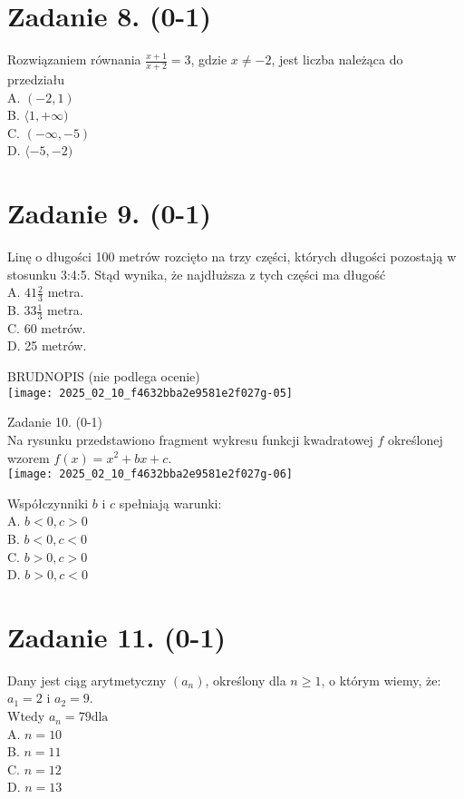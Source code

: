 \documentclass[10pt]{article}
\begin{document}
\section*{Zadanie 8. (0-1)}
Rozwiązaniem równania \(\frac{x+1}{x+2}=3\), gdzie \(x \neq-2\), jest liczba należąca do przedziału\\
A. \((-2,1)\)\\
B. \(\langle 1,+\infty)\)\\
C. \((-\infty,-5)\)\\
D. \(\langle-5,-2)\)

\section*{Zadanie 9. (0-1)}
Linę o długości 100 metrów rozcięto na trzy części, których długości pozostają w stosunku 3:4:5. Stąd wynika, że najdłuższa z tych części ma długość\\
A. \(41 \frac{2}{3}\) metra.\\
B. \(33 \frac{1}{3}\) metra.\\
C. 60 metrów.\\
D. 25 metrów.

BRUDNOPIS (nie podlega ocenie)\\
\texttt{[image: 2025\_02\_10\_f4632bba2e9581e2f027g-05]}

Zadanie 10. (0-1)\\
Na rysunku przedstawiono fragment wykresu funkcji kwadratowej \(f\) określonej wzorem \(f(x)=x^{2}+b x+c\).\\
\texttt{[image: 2025\_02\_10\_f4632bba2e9581e2f027g-06]}

Współczynniki \(b\) i \(c\) spełniają warunki:\\
A. \(b<0, c>0\)\\
B. \(b<0, c<0\)\\
C. \(b>0, c>0\)\\
D. \(b>0, c<0\)

\section*{Zadanie 11. (0-1)}
Dany jest ciąg arytmetyczny \(\left(a_{n}\right)\), określony dla \(n \geq 1\), o którym wiemy, że: \(a_{1}=2\) i \(a_{2}=9\).\\
Wtedy \(a_{n}=79 \mathrm{dla}\)\\
A. \(n=10\)\\
B. \(n=11\)\\
C. \(n=12\)\\
D. \(n=13\)
\end{document}
